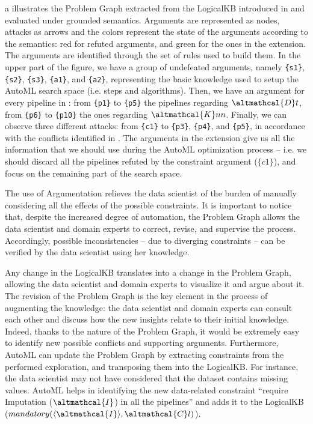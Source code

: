 \begin{example}
a illustrates the Problem Graph extracted from the LogicalKB introduced in  and evaluated under grounded semantics.
Arguments are represented as nodes, attacks as arrows and the colors represent the state of the arguments according to the semantics: red for refuted arguments, and green for the ones in the extension.
The arguments are identified through the set of rules used to build them.
In the upper part of the figure, we have a group of undefeated arguments, namely \texttt{\{s1\}}, \texttt{\{s2\}}, \texttt{\{s3\}}, \texttt{\{a1\}}, and \texttt{\{a2\}}, representing the basic knowledge used to setup the AutoML search space (i.e. steps and algorithms).
Then, we have an argument for every pipeline in : from \texttt{\{p1\}} to \texttt{\{p5\}} the pipelines regarding $\altmathcal{D}t$, from \texttt{\{p6\}} to \texttt{\{p10\}} the ones regarding $\altmathcal{K}nn$.
Finally, we can observe three different attacks: from \texttt{\{c1\}} to \texttt{\{p3\}}, \texttt{\{p4\}}, and \texttt{\{p5\}}, in accordance with the conflicts identified in .
The arguments in the extension give us all the information that we should use during the AutoML optimization process -- i.e. we should discard all the pipelines refuted by the constraint argument ($\{c1\}$), and focus on the remaining part of the search space.
\label{ex:graph}
\end{example}

The use of Argumentation relieves the data scientist of the burden of manually considering all the effects of the possible constraints.
It is important to notice that, despite the increased degree of automation, the Problem Graph allows the data scientist and domain experts to correct, revise, and supervise the process.
Accordingly, possible inconsistencies -- due to diverging constraints -- can be verified by the data scientist using her knowledge.

Any change in the LogicalKB translates into a change in the Problem Graph, allowing the data scientist and domain experts to visualize it and argue about it.
The revision of the Problem Graph is the key element in the process of augmenting the knowledge: the data scientist and domain experts can consult each other and discuss how the new insights relate to their initial knowledge.
Indeed, thanks to the nature of the Problem Graph, it would be extremely easy to identify new possible conflicts and supporting arguments.
Furthermore, AutoML can update the Problem Graph by extracting constraints from the performed exploration, and transposing them into the LogicalKB.
For instance, the data scientist may not have considered that the dataset contains missing values.
AutoML helps in identifying the new data-related constraint ``require Imputation ($\altmathcal{I}$) in all the pipelines'' and adds it to the LogicalKB ($mandatory(\langle \altmathcal{I} \rangle, \altmathcal{C}l)$).

